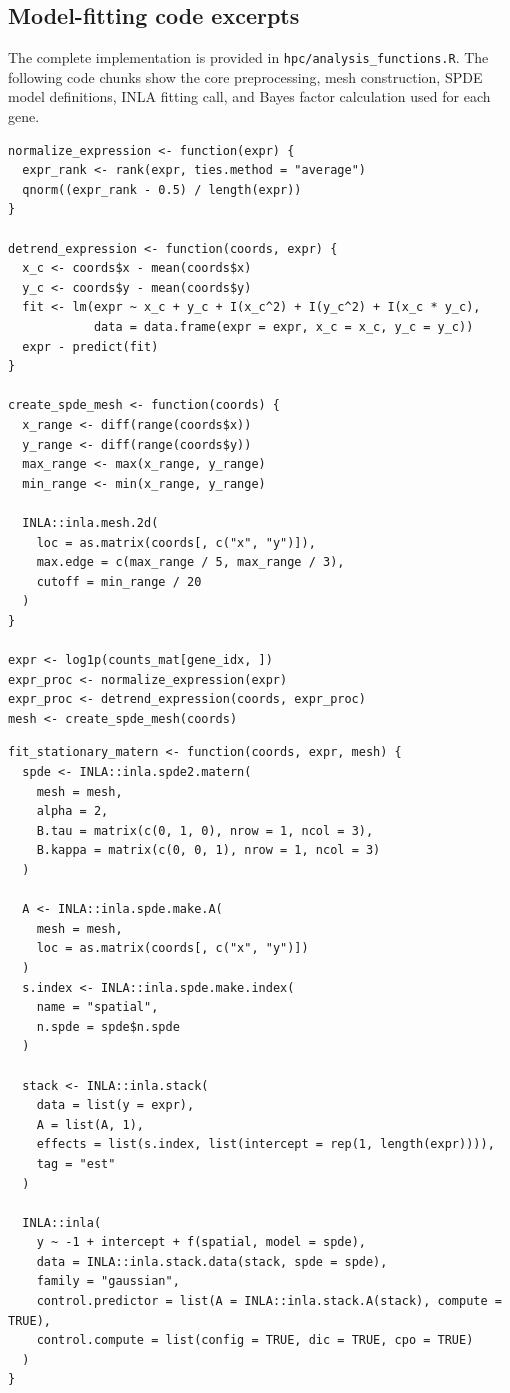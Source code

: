 \subsection{Model-fitting code excerpts}
The complete implementation is provided in \texttt{hpc/analysis\_functions.R}. The following code chunks show the core preprocessing, mesh construction, SPDE model definitions, INLA fitting call, and Bayes factor calculation used for each gene.

\begin{lstlisting}[style=rcode,caption={Preprocessing and shared SPDE mesh construction.}]
normalize_expression <- function(expr) {
  expr_rank <- rank(expr, ties.method = "average")
  qnorm((expr_rank - 0.5) / length(expr))
}

detrend_expression <- function(coords, expr) {
  x_c <- coords$x - mean(coords$x)
  y_c <- coords$y - mean(coords$y)
  fit <- lm(expr ~ x_c + y_c + I(x_c^2) + I(y_c^2) + I(x_c * y_c),
            data = data.frame(expr = expr, x_c = x_c, y_c = y_c))
  expr - predict(fit)
}

create_spde_mesh <- function(coords) {
  x_range <- diff(range(coords$x))
  y_range <- diff(range(coords$y))
  max_range <- max(x_range, y_range)
  min_range <- min(x_range, y_range)

  INLA::inla.mesh.2d(
    loc = as.matrix(coords[, c("x", "y")]),
    max.edge = c(max_range / 5, max_range / 3),
    cutoff = min_range / 20
  )
}

expr <- log1p(counts_mat[gene_idx, ])
expr_proc <- normalize_expression(expr)
expr_proc <- detrend_expression(coords, expr_proc)
mesh <- create_spde_mesh(coords)
\end{lstlisting}

\begin{lstlisting}[style=rcode,caption={Stationary Matern SPDE model and INLA fitting call.}]
fit_stationary_matern <- function(coords, expr, mesh) {
  spde <- INLA::inla.spde2.matern(
    mesh = mesh,
    alpha = 2,
    B.tau = matrix(c(0, 1, 0), nrow = 1, ncol = 3),
    B.kappa = matrix(c(0, 0, 1), nrow = 1, ncol = 3)
  )

  A <- INLA::inla.spde.make.A(
    mesh = mesh,
    loc = as.matrix(coords[, c("x", "y")])
  )
  s.index <- INLA::inla.spde.make.index(
    name = "spatial",
    n.spde = spde$n.spde
  )

  stack <- INLA::inla.stack(
    data = list(y = expr),
    A = list(A, 1),
    effects = list(s.index, list(intercept = rep(1, length(expr)))),
    tag = "est"
  )

  INLA::inla(
    y ~ -1 + intercept + f(spatial, model = spde),
    data = INLA::inla.stack.data(stack, spde = spde),
    family = "gaussian",
    control.predictor = list(A = INLA::inla.stack.A(stack), compute = TRUE),
    control.compute = list(config = TRUE, dic = TRUE, cpo = TRUE)
  )
}
\end{lstlisting}

